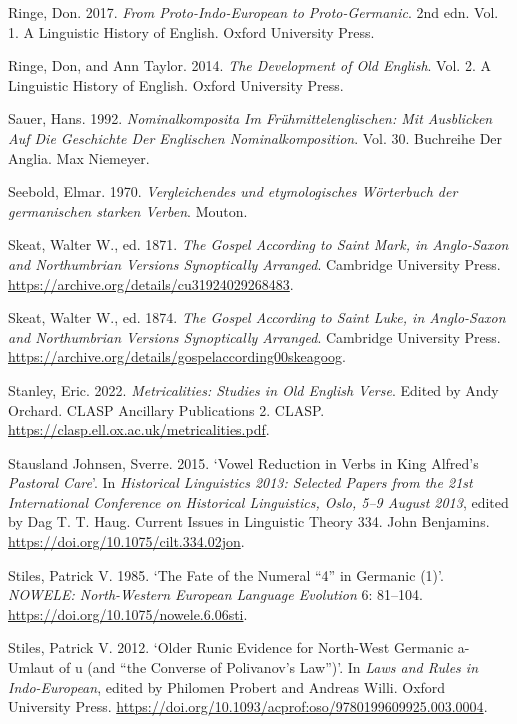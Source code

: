 \documentclass[
  british,
  a4paper,
]{article}
\newlength{\cslhangindent}
\newenvironment{CSLReferences}[2] %
 {\begin{list}{}{%
  \setlength{\itemindent}{0pt}
  \setlength{\leftmargin}{0pt}
  \setlength{\parsep}{0pt}
  \ifodd #1
   \setlength{\leftmargin}{\cslhangindent}
   \setlength{\itemindent}{-1\cslhangindent}
  \fi
  \setlength{\itemsep}{#2\baselineskip}}}
 {\end{list}}
\begin{document}
\begin{CSLReferences}{1}{1}
Ringe, Don. 2017. \emph{From {Proto-Indo-European} to {Proto-Germanic}}.
2nd edn. Vol. 1. A Linguistic History of English. Oxford University
Press.

Ringe, Don, and Ann Taylor. 2014. \emph{The Development of {Old
English}}. Vol. 2. A Linguistic History of English. Oxford University
Press.

Sauer, Hans. 1992. \emph{Nominalkomposita Im Frühmittelenglischen: Mit
Ausblicken Auf Die Geschichte Der Englischen Nominalkomposition}. Vol.
30. Buchreihe Der Anglia. Max Niemeyer.

Seebold, Elmar. 1970. \emph{{Vergleichendes und etymologisches
W{ö}rterbuch der germanischen starken Verben}}. Mouton.

Skeat, Walter W., ed. 1871. \emph{The Gospel According to Saint Mark, in
Anglo-Saxon and Northumbrian Versions Synoptically Arranged}. Cambridge
University Press. \url{https://archive.org/details/cu31924029268483}.

Skeat, Walter W., ed. 1874. \emph{The Gospel According to Saint Luke, in
Anglo-Saxon and Northumbrian Versions Synoptically Arranged}. Cambridge
University Press.
\url{https://archive.org/details/gospelaccording00skeagoog}.

Stanley, Eric. 2022. \emph{Metricalities: Studies in Old English Verse}.
Edited by Andy Orchard. CLASP Ancillary Publications 2. CLASP.
\url{https://clasp.ell.ox.ac.uk/metricalities.pdf}.

Stausland Johnsen, Sverre. 2015. {`Vowel Reduction in Verbs in {King}
{Alfred's} \emph{Pastoral Care}'}. In \emph{Historical Linguistics 2013:
Selected Papers from the 21st International Conference on Historical
Linguistics, Oslo, 5--9 August 2013}, edited by Dag T. T. Haug. Current
Issues in Linguistic Theory 334. John Benjamins.
\url{https://doi.org/10.1075/cilt.334.02jon}.

Stiles, Patrick V. 1985. {`The Fate of the Numeral {``4''} in Germanic
(1)'}. \emph{NOWELE: North-Western European Language Evolution} 6:
81--104. \url{https://doi.org/10.1075/nowele.6.06sti}.

Stiles, Patrick V. 2012. {`Older {Runic} Evidence for {North-West
Germanic} {a-}Umlaut of {u} (and {``the Converse of {Polivanov's}
Law''})'}. In \emph{Laws and Rules in Indo-European}, edited by Philomen
Probert and Andreas Willi. Oxford University Press.
\url{https://doi.org/10.1093/acprof:oso/9780199609925.003.0004}.


\end{CSLReferences}
\end{document}
